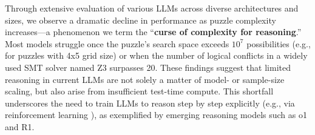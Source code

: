 %
Through extensive evaluation of various LLMs across diverse architectures and sizes, we observe a dramatic decline in performance as puzzle complexity increases---a phenomenon we term the ``\textbf{curse of complexity for reasoning}.'' Most models struggle once the puzzle's search space exceeds $10^7$ possibilities (e.g., for puzzles with 4x5 grid size) or when the number of logical conflicts in a widely used SMT solver named Z3 \citep{demoura2008z3} surpasses 20. %
These findings suggest that limited reasoning in current LLMs are not solely a matter of model- or sample-size scaling, but also arise from insufficient test-time compute. This shortfall underscores the need to train LLMs to reason step by step \cite{Wei2022ChainOT} explicitly (e.g., via reinforcement learning \cite{Lambert2024TLU3P}), as exemplified by emerging reasoning models such as o1 and R1. %
